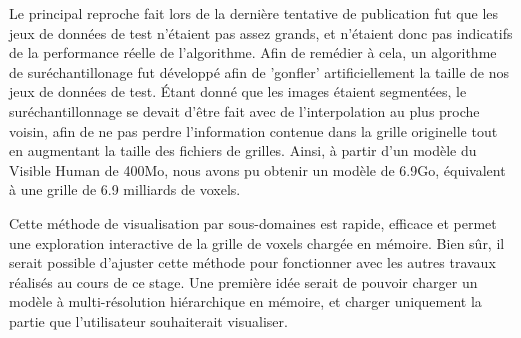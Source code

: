 {{{			Le principal reproche fait lors de la dernière tentative de publication fut que les jeux de données de test n'étaient pas assez grands, et n'étaient donc pas indicatifs de la performance réelle de l'algorithme. Afin de remédier à cela, un algorithme de suréchantillonage fut développé afin de 'gonfler' artificiellement la taille de nos jeux de données de test. Étant donné que les images étaient segmentées, le suréchantillonnage se devait d'être fait avec de l'interpolation au plus proche voisin, afin de ne pas perdre l'information contenue dans la grille originelle tout en augmentant la taille des fichiers de grilles. Ainsi, à partir d'un modèle du Visible Human de 400Mo, nous avons pu obtenir un modèle de 6.9Go, équivalent à une grille de 6.9 milliards de voxels.
		}

		Cette méthode de visualisation par sous-domaines est rapide, efficace et permet une exploration interactive de la grille de voxels chargée en mémoire. Bien sûr, il serait possible d'ajuster cette méthode pour fonctionner avec les autres travaux réalisés au cours de ce stage. Une première idée serait de pouvoir charger un modèle à multi-résolution hiérarchique en mémoire, et charger uniquement la partie que l'utilisateur souhaiterait visualiser.
	}

}

